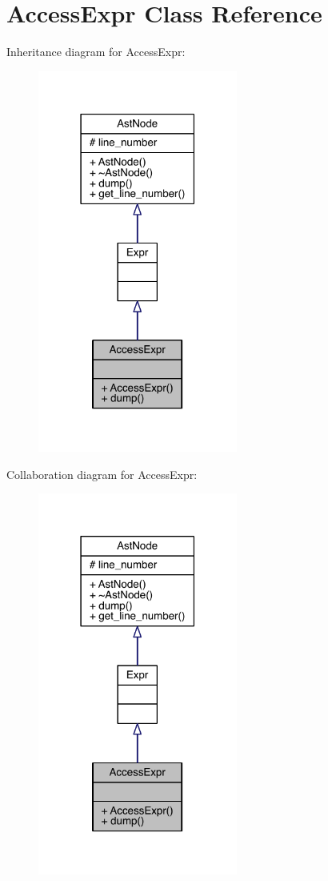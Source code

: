 \hypertarget{class_access_expr}{}\section{Access\+Expr Class Reference}
\label{class_access_expr}


Inheritance diagram for Access\+Expr\+:\nopagebreak
\begin{figure}[H]
\begin{center}
\leavevmode
\includegraphics[width=186pt]{class_access_expr__inherit__graph}
\end{center}
\end{figure}


Collaboration diagram for Access\+Expr\+:\nopagebreak
\begin{figure}[H]
\begin{center}
\leavevmode
\includegraphics[width=186pt]{class_access_expr__coll__graph}
\end{center}
\end{figure}
